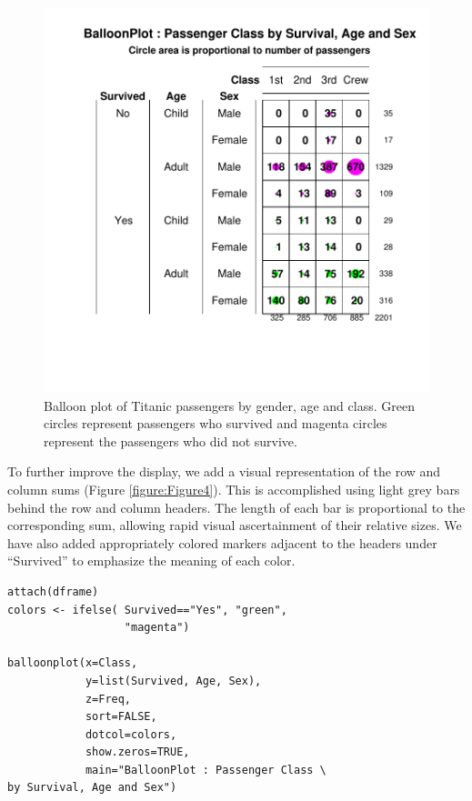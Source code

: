 \documentclass[a4paper]{report}
\begin{document}
\begin{article}
\begin{figure}
\includegraphics[width=\textwidth]{Figure3.pdf}
\caption{\label{figure:Figure3}
  Balloon plot of Titanic passengers by gender, age and class. Green
  circles represent passengers who survived and magenta circles
  represent the passengers who did not survive.}
\end{figure}


To further improve the display, we add a visual
representation of the row and column sums (Figure
\ref{figure:Figure4}).  This is accomplished using light grey bars
behind the row and column headers.  The length of each bar is
proportional to the corresponding sum, allowing rapid visual
ascertainment of their relative sizes.  We have also added
appropriately colored markers adjacent to the headers under
``Survived'' to emphasize the meaning of each color.

{
\small
\begin{verbatim}
attach(dframe)
colors <- ifelse( Survived=="Yes", "green", 
                  "magenta")

balloonplot(x=Class,
            y=list(Survived, Age, Sex),
            z=Freq,
            sort=FALSE,
            dotcol=colors,
            show.zeros=TRUE,
            main="BalloonPlot : Passenger Class \
by Survival, Age and Sex")


\end{verbatim}}
\end{article}
\end{document}
